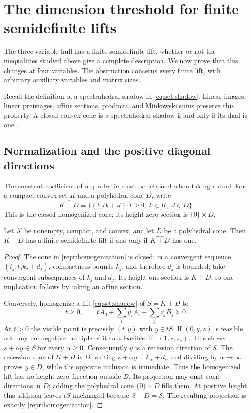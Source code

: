 \section{The dimension threshold for finite semidefinite lifts}
\label{repr:section}

The three-variable hull has a finite semidefinite lift, whether or not the
inequalities studied above give a complete description. We now prove that this
changes at four variables. The obstruction concerns every finite lift, with
arbitrary auxiliary variables and matrix sizes.

Recall the definition of a spectrahedral shadow in \eqref{eq:set:shadow}.
Linear images, linear preimages, affine sections, products, and
Minkowski sums preserve this property. A closed convex cone is a spectrahedral
shadow if and only if its dual is one
\citep[Remark~3.17]{BodirskyKummerThom2024}.

\subsection{Normalization and the positive diagonal directions}

The constant coefficient of a quadratic must be retained when taking a dual.
For a compact convex set $K$ and a polyhedral cone $D$, write
\begin{equation}\label{repr:homogenization}
 \widehat{K+D}
 =\{(t,tk+d):t\geq0,\ k\in K,\ d\in D\}.
\end{equation}
This is the closed homogenized cone; its height-zero section is
$\{0\}\times D$.

\begin{lemma}\label{repr:normalization}
Let $K$ be nonempty, compact, and convex, and let $D$ be a polyhedral cone.
Then $K+D$ has a finite semidefinite lift if and only if
$\widehat{K+D}$ has one.
\end{lemma}
\begin{proof}
The cone in \eqref{repr:homogenization} is closed: in a convergent sequence
$(t_j,t_jk_j+d_j)$, compactness bounds $k_j$, and therefore $d_j$ is bounded;
take convergent subsequences of $k_j$ and $d_j$. Its height-one section is
$K+D$, so one implication follows by taking an affine section.

Conversely, homogenize a lift \eqref{eq:set:shadow} of $S=K+D$ to
\[
 t\geq0,\qquad
 tA_0+\sum_i y_iA_i+\sum_j z_jB_j\succeq0.
\]
At $t>0$ the visible point is precisely $(t,y)$ with $y\in tS$.
If $(0,y,z)$ is feasible, add any nonnegative multiple of it to a feasible
lift $(1,s,z_s)$. This shows $s+\alpha y\in S$ for every $\alpha\geq0$.
Consequently $y$ is a recession direction of $S$. The recession cone of
$K+D$ is $D$: writing $s+\alpha y=k_\alpha+d_\alpha$ and dividing by
$\alpha\to\infty$ proves $y\in D$, while the opposite inclusion is immediate.
Thus the homogenized lift has no height-zero direction outside $D$.
Its projection may omit some directions in $D$; adding the polyhedral cone
$\{0\}\times D$ fills them. At positive height this addition leaves $tS$
unchanged because $S+D=S$. The resulting projection is exactly
\eqref{repr:homogenization}.
\end{proof}

